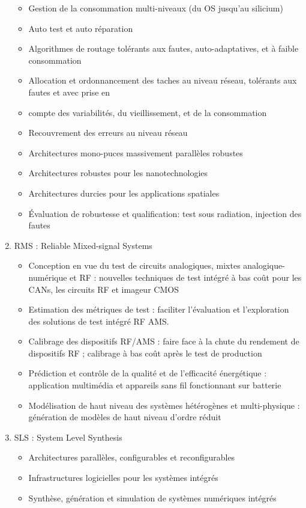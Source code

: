 \begin{enumerate}
\begin{itemize}
	\item Gestion de la consommation multi-niveaux (du OS jusqu'au silicium)
	\item Auto test et auto réparation
	\item Algorithmes de routage tolérants aux fautes, auto-adaptatives, et à faible consommation
	\item Allocation et ordonnancement des taches au niveau réseau, tolérants aux fautes et avec prise en \item compte des variabilités, du vieillissement, et de la consommation
	\item Recouvrement des erreurs au niveau réseau
	\item Architectures mono-puces massivement parallèles robustes
	\item Architectures robustes pour les nanotechnologies
	\item Architectures durcies pour les applications spatiales
	\item Évaluation de robustesse et qualification: test sous radiation, injection des fautes
\end{itemize}
\item RMS : Reliable Mixed-signal Systems
\begin{itemize}
	\item Conception en vue du test de circuits analogiques, mixtes analogique-numérique et RF : nouvelles techniques de test intégré à bas coût pour les CANs, les circuits RF et imageur CMOS
	\item Estimation des métriques de test : faciliter l'évaluation et l'exploration des solutions de test intégré RF AMS.
	\item Calibrage des dispositifs RF/AMS : faire face à la chute du rendement de dispositifs RF ; calibrage à bas coût après le test de production
	\item Prédiction et contrôle de la qualité et de l'efficacité énergétique : application multimédia et appareils sans fil fonctionnant sur batterie
	\item Modélisation de haut niveau des systèmes hétérogènes et multi-physique : génération de modèles de haut niveau d'ordre réduit
\end{itemize}
\item SLS : System Level Synthesis
\begin{itemize}
	\item Architectures parallèles, configurables et reconfigurables
	\item Infrastructures logicielles pour les systèmes intégrés
	\item Synthèse, génération et simulation de systèmes numériques intégrés
\end{itemize}
\end{enumerate}


